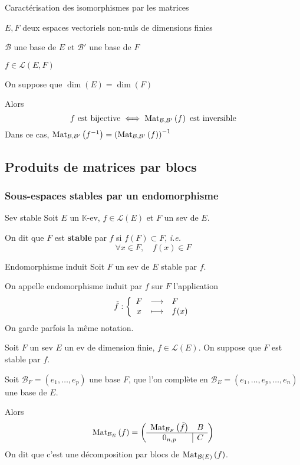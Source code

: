     \begin{coro}{Caractérisation des isomorphismes par les matrices}{}
        \begin{soient}
            \item $E,F$ deux espaces vectoriels non-nuls de dimensions finies
            \item $\mathcal{B}$ une base de $E$ et $\mathcal{B}'$ une base de $F$
            \item $f \in \mathcal{L}(E,F)$
        \end{soient}
        On suppose que $\dim(E) = \dim(F)$

        Alors \[ f \text{ est bijective} \iff \text{Mat}_{\mathcal{B},\mathcal{B}'}\left(f\right) \text{ est inversible} \]
        Dans ce cas, $\text{Mat}_{\mathcal{B},\mathcal{B}'}\left(f^{-1}\right) = \left(\text{Mat}_{\mathcal{B},\mathcal{B}'}\left(f\right)\right)^{-1}$
    \end{coro}

\subsection{Produits de matrices par blocs}

    \subsubsection{Sous-espaces stables par un endomorphisme}

    \begin{defi}{Sev stable}{}
        Soit $E$ un $\mathbb{K}$-ev, $f \in \mathcal{L}(E)$ et $F$ un sev de $E$.

        On dit que $F$ est \textbf{stable} par $f$ si  $f(F) \subset F$, \textit{i.e.}
        \[ \forall x \in F, \quad f(x) \in F \]
    \end{defi}

    \begin{defi}{Endomorphisme induit}{}
        Soit $F$ un sev de $E$ stable par $f$.

        On appelle endomorphisme induit par $f$ sur $F$ l’application 
        \[ \fonction{\tilde{f}}{F}{F}{x}{f(x)} \]
        On garde parfois la même notation.
    \end{defi}

    \begin{prop}{}{}
        Soit $F$ un sev $E$ un ev de dimension finie, $f \in \mathcal{L}(E)$. On suppose que $F$ est stable par $f$. 

        Soit $\mathcal{B}_F = (e_1,\ldots, e_p)$ une base $F$, que l’on complète en $\mathcal{B}_E = (e_1,\ldots,e_p , \ldots, e_n)$ une base de $E$.

        Alors 
        \[ \text{Mat}_{\mathcal{B}_E}\left(f\right) = \left( \begin{array}{c | c}
            \text{Mat}_{\mathcal{B}_F}\left(\tilde{f}\right) & B \\
            \hline 
            0_{n,p} & C 
        \end{array} \right) \]
        On dit que c’est une décomposition par blocs de $\text{Mat}_{\mathcal{B}(E)}\left(f\right)$. 
    \end{prop}

